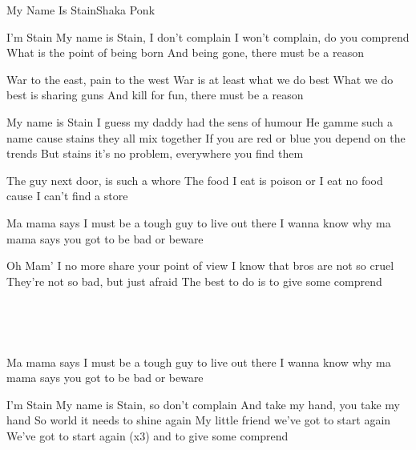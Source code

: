 \documentclass[a4paper,11pt,french]{article}
\begin{document}
\begin{Song}{My Name Is Stain}{Shaka Ponk}

\begin{Verse}
I'm Stain
My name is Stain, I don't complain 
I won't complain, do you comprend
What is the point of being born
And being gone, there must be a reason
\espaceInterStrophe

War to the east, pain to the west
War is at least what we do best
What we do best is sharing guns
And kill for fun, there must be a reason
\end{Verse}
\espaceInterStrophe

\begin{Chorus}
My name is Stain I guess my daddy had the sens of humour
He gamme such a name cause stains they all mix together
If you are red or blue you depend on the trends
But stains it's no problem, everywhere you find them
\end{Chorus}
\espaceInterStrophe

\begin{Verse}
The guy next door, is such a whore
The food I eat is poison or
I eat no food cause I can't find a store
\end{Verse}
\espaceInterStrophe

\begin{Chorus}
Ma mama says I must be a tough guy to live out there
I wanna know why ma mama says you got to be bad or beware
\end{Chorus}
\espaceInterStrophe

\begin{Verse}
Oh Mam'
I no more share your point of view
I know that bros are not so cruel
They're not so bad, but just afraid
The best to do is to give some comprend
\end{Verse}
\espaceInterStrophe

\\
\espaceInterStrophe

\tochorus\\
\espaceInterStrophe

\begin{Chorus}
Ma mama says I must be a tough guy to live out there
I wanna know why ma mama says you got to be bad or beware
\end{Chorus}
\espaceInterStrophe

\begin{Verse}
I'm Stain
My name is Stain, so don't complain
And take my hand, you take my hand
So world it needs to shine again
My little friend we've got to start again
We've got to start again (x3)
and to give some comprend
\end{Verse}


\end{Song}
\end{document}
